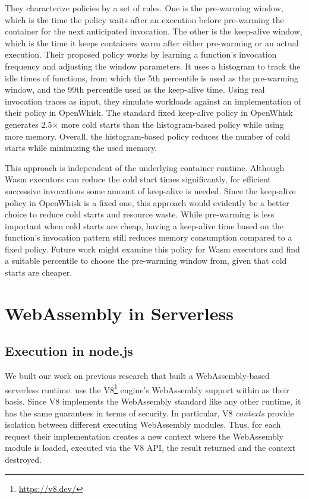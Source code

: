 They characterize policies by a set of rules. One is the pre-warming window, which is the time the policy waits after an execution before pre-warming the container for the next anticipated invocation. The other is the keep-alive window, which is the time it keeps containers warm after either pre-warming or an actual execution.
Their proposed policy works by learning a function's invocation frequency and adjusting the window parameters. It uses a histogram to track the idle times of functions, from which the 5th percentile is used as the pre-warming window, and the 99th percentile used as the keep-alive time.
Using real invocation traces as input, they simulate workloads against an implementation of their policy in OpenWhisk. 
The standard fixed keep-alive policy in OpenWhisk generates 2.5$\times$ more cold starts than the histogram-based policy while using more memory. Overall, the histogram-based policy reduces the number of cold starts while minimizing the used memory.

This approach is independent of the underlying container runtime. Although Wasm executors can reduce the cold start times significantly, for efficient successive invocations some amount of keep-alive is needed. Since the keep-alive policy in OpenWhisk is a fixed one, this approach would evidently be a better choice to reduce cold starts and resource waste. While pre-warming is less important when cold starts are cheap, having a keep-alive time based on the function's invocation pattern still reduces memory consumption compared to a fixed policy. Future work might examine this policy for Wasm executors and find a suitable percentile to choose the pre-warming window from, given that cold starts are cheaper.

\section{WebAssembly in Serverless}

\subsection{Execution in node.js}

We built our work on previous research that built a WebAssembly-based serverless runtime. \citeauthor{Hall2019} use the V8\footnote{\url{https://v8.dev/}} engine's WebAssembly support within  as their basis.
Since V8 implements the WebAssembly standard like any other runtime, it has the same guarantees in terms of security. In particular, V8 \emph{contexts} provide isolation between different executing WebAssembly modules. Thus, for each request their implementation creates a new context where the WebAssembly module is loaded, executed via the V8 API, the result returned and the context destroyed.

